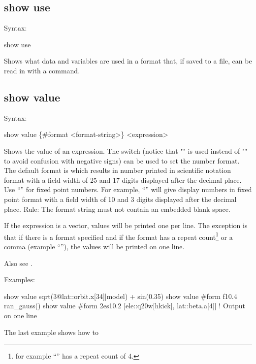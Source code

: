 {{{{{{{{{{%

\subsection{show use}
\label{s:show.use}

Syntax:
\begin{example}
  show use
\end{example}

Shows what data and variables are used in a format that, if saved to a file, can be read
in with a  command.


\subsection{show value}
\label{s:show.value}

Syntax:
\begin{example}
  show value \{#format <format-string>\} <expression>
\end{example}

Shows the value of an expression. The  switch (notice that "\vn{\#}" is used instead of
"\vn{-}" to avoid confusion with negative signs) can be used to set the number format.  The default
format is  which results in number printed in scientific notation format with a field
width of 25 and 17 digits displayed after the decimal place. Use ``'' for fixed point
numbers. For example, ``'' will give display numbers in fixed point format with a field
width of 10 and 3 digits displayed after the decimal place. Rule: The format string must not contain
an embedded blank space.

If the expression is a vector, values will be printed one per line. The exception is that if there
is a format specified and if the format has a repeat count\footnote
  {
for example ``'' has a repeat count of 4.
  }
or a comma (example ``''), the values will be printed on one line. 


Also see .

Examples:
\begin{example}
  show value sqrt(3@lat::orbit.x[34]|model) + sin(0.35)
  show value #form f10.4 ran_gauss()
  show value #form 2es10.2 [ele::q20w[hkick], lat::beta.a[4]] ! Output on one line
\end{example}
The last example shows how to 


}}}}}}}}}}
